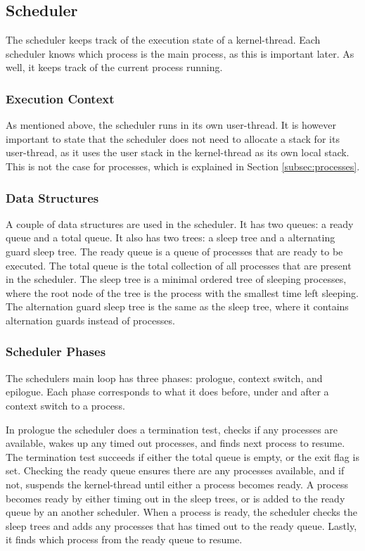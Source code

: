 \subsection{Scheduler}
\label{subsec:scheduler}

The scheduler keeps track of the execution state of a kernel\hyp{}thread. Each scheduler knows which process is the main process, as this is important later. As well, it keeps track of the current process running. 

\subsubsection*{Execution Context}

As mentioned above, the scheduler runs in its own user\hyp{}thread. It is however important to state that the scheduler does not need to allocate a stack for its user\hyp{}thread, as it uses the user stack in the kernel\hyp{}thread as its own local stack. This is not the case for processes, which is explained in Section \ref{subsec:processes}.

\subsubsection*{Data Structures}

A couple of data structures are used in the scheduler. It has two queues: a ready queue and a total queue. It also has two trees: a sleep tree and a alternating guard sleep tree. The ready queue is a queue of processes that are ready to be executed. The total queue is the total collection of all processes that are present in the scheduler. The sleep tree is a minimal ordered tree of sleeping processes, where the root node of the tree is the process with the smallest time left sleeping. The alternation guard sleep tree is the same as the sleep tree, where it contains alternation guards instead of processes.

\subsubsection*{Scheduler Phases}

The schedulers main loop has three phases: prologue, context switch, and epilogue. Each phase corresponds to what it does before, under and after a context switch to a process. 

In prologue the scheduler does a termination test, checks if any processes are available, wakes up any timed out processes, and finds next process to resume. The termination test succeeds if either the total queue is empty, or the exit flag is set. Checking the ready queue ensures there are any processes available, and if not, suspends the kernel\hyp{}thread until either a process becomes ready. A process becomes ready by either timing out in the sleep trees, or is added to the ready queue by an another scheduler. When a process is ready, the scheduler checks the sleep trees and adds any processes that has timed out to the ready queue. Lastly, it finds which process from the ready queue to resume.

